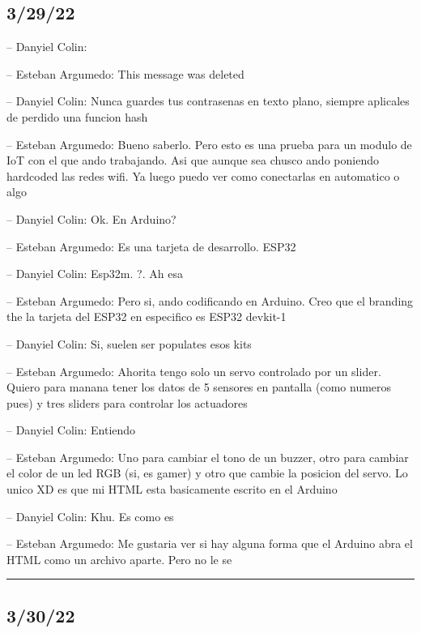 \hypertarget{section-42}{%
\subsection{3/29/22}\label{section-42}}

-- Danyiel Colin:

-- Esteban Argumedo: This message was deleted

-- Danyiel Colin: Nunca guardes tus contrasenas en texto plano, siempre
aplicales de perdido una funcion hash

-- Esteban Argumedo: Bueno saberlo. Pero esto es una prueba para un
modulo de IoT con el que ando trabajando. Asi que aunque sea chusco ando
poniendo hardcoded las redes wifi. Ya luego puedo ver como conectarlas
en automatico o algo

-- Danyiel Colin: Ok. En Arduino?

-- Esteban Argumedo: Es una tarjeta de desarrollo. ESP32

-- Danyiel Colin: Esp32m. ?. Ah esa

-- Esteban Argumedo: Pero si, ando codificando en Arduino. Creo que el
branding the la tarjeta del ESP32 en especifico es ESP32 devkit-1

-- Danyiel Colin: Si, suelen ser populates esos kits

-- Esteban Argumedo: Ahorita tengo solo un servo controlado por un
slider. Quiero para manana tener los datos de 5 sensores en pantalla
(como numeros pues) y tres sliders para controlar los actuadores

-- Danyiel Colin: Entiendo

-- Esteban Argumedo: Uno para cambiar el tono de un buzzer, otro para
cambiar el color de un led RGB (si, es gamer) y otro que cambie la
posicion del servo. Lo unico XD es que mi HTML esta basicamente escrito
en el Arduino

-- Danyiel Colin: Khu. Es como es

-- Esteban Argumedo: Me gustaria ver si hay alguna forma que el Arduino
abra el HTML como un archivo aparte. Pero no le se

\begin{center}\rule{0.5\linewidth}{0.5pt}\end{center}

\hypertarget{section-43}{%
\subsection{3/30/22}\label{section-43}}


